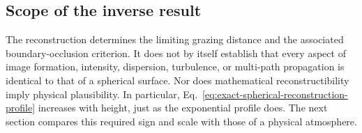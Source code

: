 \subsection{Scope of the inverse result}

The reconstruction determines the limiting grazing distance and the associated
boundary-occlusion criterion. It does not by itself establish
that every aspect of image formation, intensity, dispersion, turbulence, or
multi-path propagation is identical to that of a spherical surface. Nor does
mathematical reconstructibility imply physical plausibility. In particular,
Eq.~\eqref{eq:exact-spherical-reconstruction-profile} increases with height,
just as the exponential profile does. The next section compares this required
sign and scale with those of a physical atmosphere.
